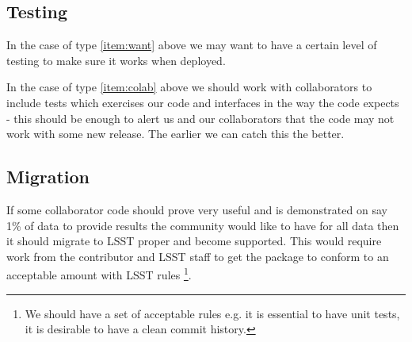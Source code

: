 \subsection{Testing} \label{sec:p3test}
In the case of type \ref{item:want} above we may want to have a certain level of testing to make sure it works when deployed.

In the case of type \ref{item:colab} above we should work with collaborators to include tests which exercises our code and interfaces in the way the code expects - this should be enough to alert us and our collaborators that the code may not work with some new release. The earlier we can catch this the better.
\subsection{Migration}\label{sec:migration}
If some collaborator code should prove very useful and is demonstrated  on say 1\% of data to provide results the community would like to have for all data then it should migrate to LSST proper and become supported. This would require work from the contributor and LSST staff to get the package to conform to an acceptable amount with LSST rules \footnote{We should have a set of acceptable rules e.g. it is essential to have unit tests, it is desirable to have a clean commit history.}.
